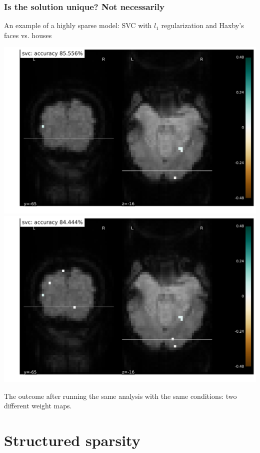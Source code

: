 \documentclass[11pt]{beamer}
\begin{document}
\begin{frame}
  \frametitle{Is the solution unique? Not necessarily}
  An example of a highly sparse model: SVC with $l_1$ regularization and Haxby's
  faces vs. houses
    \begin{center}
      \includegraphics[scale=0.22]{figures/haxby_svc_plotmap_7e41.png}
      \includegraphics[scale=0.22]{figures/haxby_svc_plotmap_b073.png}
    \end{center}
    The outcome after running the same analysis with the same conditions: two
    different weight maps.
\end{frame}

\section{Structured sparsity}
\label{sec:Structured sparsity}
\end{document}

